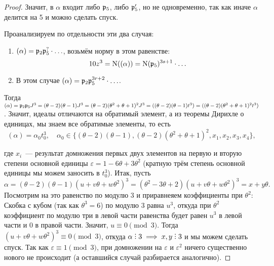 \begin{proof}
	  	Значит, в $\alpha$ входит либо $\mathfrak{p}_{5}$, либо $\mathfrak{p}'_{5}$, но не одновременно, так как иначе $\alpha$ делится на 5 и можно сделать спуск. 

	  	Проанализируем по отдельности эти два случая: 
	  	\begin{enumerate}
	  		\item $(\alpha) = \mathfrak{p}_{2} \mathfrak{p}_{5}^{?} \cdot \ldots$, возьмём норму в этом равенстве: 
	  		\[
	  			10z^3 = \operatorname{\mathrm{N}}((\alpha)) = \operatorname{\mathrm{N}}(\mathfrak{p}_5)^{3s + 1} \cdot \ldots
	  		\]
	  		\item В этом случае $(\alpha) = \mathfrak{p}_2 \mathfrak{p}_5^{3r + 2} \cdot \ldots$. 
	  	\end{enumerate}

	  	Тогда $(\alpha) = \mathfrak{p}_2 \mathfrak{p}_5 J^3 = (\theta - 2)(\theta - 1)J^3 = (\theta - 2)(\theta^2 + \theta + 1)^2 J^3 = ((\theta - 2)(\theta - 1)t^3) = ((\theta - 2)(\theta^2 + \theta + 1)^2 t^3)$. Значит, идеалы отличаются на обратимый элемент, а из теоремы Дирихле о единицах, мы знаем все обратимые элементы, то есть 
  		\[
  			(\alpha) = \alpha_0 t_0^3, \quad \alpha_0 \in \{ (\theta - 2)(\theta - 1), (\theta - 2)(\theta^2 + \theta + 1)^2,  x_1, x_2, x_3, x_4 \},
  		\]

  		где $x_i$~--- результат домножения первых двух элементов на первую и вторую степени основной единицы $\varepsilon = 1 - 6\theta + 3\theta^2$ (кратную трём степень основной единицы мы можем заносить в $t_0^3$). Итак, пусть 
  		\[
  			\alpha = (\theta - 2)(\theta - 1)(u + v\theta + w\theta^2)^3 = (\theta^2 - 3\theta + 2)(u + v\theta + w\theta^2)^3 = x + y \theta.
  		\]
  		Посмотрим на это равенство по модулю 3 и приравнеяем коэффициенты при $\theta^2$: 
  		Скобка с кубом (так как $\theta^3 = 6$) по модулю 3 равна $u^3$, откуда при $\theta^2$ коэффициент по модулю три в левой части равенства будет равен $u^3$ в левой части и 0 в правой части. Значит, $u \equiv 0 \pmod{3}$. Тогда $(u + v\theta + w\theta^2)^3 \equiv 0 \pmod{3}$, откуда $\alpha \divby 3 \implies x, y \divby 3$ и мы можем сделать спуск. Так как $\varepsilon \equiv 1 \pmod{3}$, при домножении на $\varepsilon$ и $\varepsilon^2$ ничего существенно нового не происходит (а оставшийся случай разбирается аналогично). 

	  	


 	  \end{proof}

	  


 



